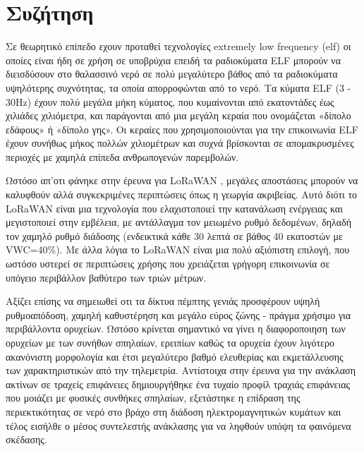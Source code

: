 \section{\textsf{Συζήτηση}}
        Σε θεωρητικό επίπεδο εχουν προταθεί τεχνολογίες extremely low frequency
        (elf) οι οποίες είναι ήδη σε χρήση σε υποβρύχια επειδή τα ραδιοκύματα ELF μπορούν να
        διεισδύσουν στο θαλασσινό νερό σε πολύ μεγαλύτερο βάθος από τα ραδιοκύματα υψηλότερης
        συχνότητας, τα οποία απορροφώνται από το νερό. Τα κύματα ELF (3 - 30Hz) έχουν πολύ
        μεγάλα μήκη κύματος, που κυμαίνονται από εκατοντάδες έως χιλιάδες χιλιόμετρα, και
        παράγονται από μια μεγάλη κεραία που ονομάζεται «δίπολο εδάφους» ή «δίπολο γης». Οι
        κεραίες που χρησιμοποιούνται για την επικοινωνία ELF έχουν συνήθως μήκος πολλών
        χιλιομέτρων και συχνά βρίσκονται σε απομακρυσμένες περιοχές με χαμηλά επίπεδα
        ανθρωπογενών παρεμβολών.

        Ωστόσο απ'οτι φάνηκε στην έρευνα για LoRaWAN \cite{zhao_feasibility_2023}, μεγάλες 
        αποστάσεις μπορούν να καλυφθούν αλλά συγκεκριμένες περιπτώσεις όπως η γεωργία ακριβείας.
        Αυτό διότι το LoRaWAN είναι μια τεχνολογία που ελαχιστοποιεί την κατανάλωση ενέργειας και
        μεγιστοποιεί στην εμβέλεια, με αντάλλαγμα τον μειωμένο ρυθμό δεδομένων, δηλαδή τον χαμηλό
        ρυθμό διάδοσης (ενδεικτικά κάθε 30 λεπτά σε βάθος 40 εκατοστών με VWC=40\%). Με άλλα
        λόγια το LoRaWAN είναι μια πολύ αξιόπιστη επιλογή, που ωστόσο υστερεί σε περιπτώσεις 
        χρήσης που χρειάζεται γρήγορη επικοινωνία σε υπόγειο περιβάλλον βαθύτερο των τριών μέτρων.

        Αξίζει επίσης να σημειωθεί οτι τα δίκτυα πέμπτης γενιάς προσφέρουν υψηλή ρυθμοαπόδοση,
        χαμηλή καθυστέρηση και μεγάλο εύρος ζώνης - πράγμα χρήσιμο για περιβάλλοντα ορυχείων.
        Ωστόσο κρίνεται σημαντικό να γίνει η διαφοροποιηση των ορυχείων με των συνήθων σπηλαίων,
        ερειπίων καθώς τα ορυχεία έχουν λιγότερο ακανόνιστη μορφολογία και έτσι μεγαλύτερο βαθμό
        ελευθερίας και εκμετάλλευσης των χαρακτηριστικών από την τηλεμετρία. Αντίστοιχα στην έρευνα
        για την ανάκλαση ακτίνων σε τραχείς επιφάνειες \cite{soo_investigation_2018} δημιουργήθηκε
        ένα τυχαίο προφίλ τραχιάς επιφάνειας που μοιάζει με φυσικές συνθήκες σπηλαίων, εξετάστηκε
        η επίδραση της περιεκτικότητας σε νερό στο βράχο στη διάδοση ηλεκτρομαγνητικών κυμάτων και
        τέλος εισήλθε ο μέσος συντελεστής ανάκλασης για να ληφθούν υπόψη τα φαινόμενα σκέδασης.

